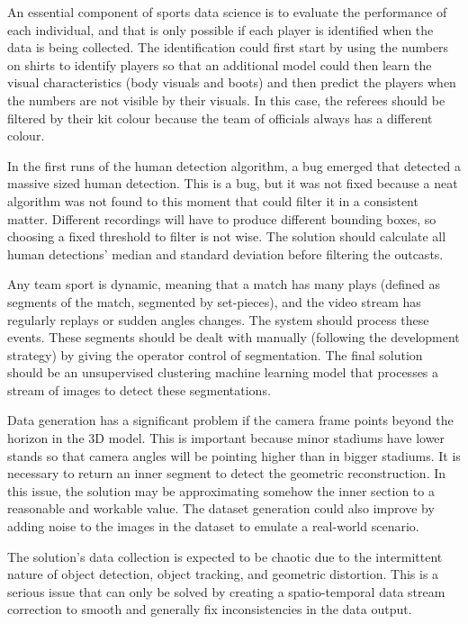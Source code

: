 \documentclass[
    11pt,
    oneside
]{report}
\begin{document}
An essential component of sports data science is to evaluate the performance of each individual, and that is only possible if each player is identified when the data is being collected. The identification could first start by using the numbers on shirts to identify players so that an additional model could then learn the visual characteristics (body visuals and boots) and then predict the players when the numbers are not visible by their visuals. In this case, the referees should be filtered by their kit colour because the team of officials always has a different colour.


In the first runs of the human detection algorithm, a bug emerged that detected a massive sized human detection. This is a bug, but it was not fixed because a neat algorithm was not found to this moment that could filter it in a consistent matter. Different recordings will have to produce different bounding boxes, so choosing a fixed threshold to filter is not wise. The solution should calculate all human detections' median and standard deviation before filtering the outcasts.


Any team sport is dynamic, meaning that a match has many plays (defined as segments of the match, segmented by set-pieces), and the video stream has regularly replays or sudden angles changes. The system should process these events. These segments should be dealt with manually (following the development strategy) by giving the operator control of segmentation. The final solution should be an unsupervised clustering machine learning model that processes a stream of images to detect these segmentations.


Data generation has a significant problem if the camera frame points beyond the horizon in the 3D model. This is important because minor stadiums have lower stands so that camera angles will be pointing higher than in bigger stadiums. It is necessary to return an inner segment to detect the geometric reconstruction. In this issue, the solution may be approximating somehow the inner section to a reasonable and workable value. The dataset generation could also improve by adding noise to the images in the dataset to emulate a real-world scenario.


The solution's data collection is expected to be chaotic due to the intermittent nature of object detection, object tracking, and geometric distortion. This is a serious issue that can only be solved by creating a spatio-temporal data stream correction to smooth and generally fix inconsistencies in the data output.
\end{document}
